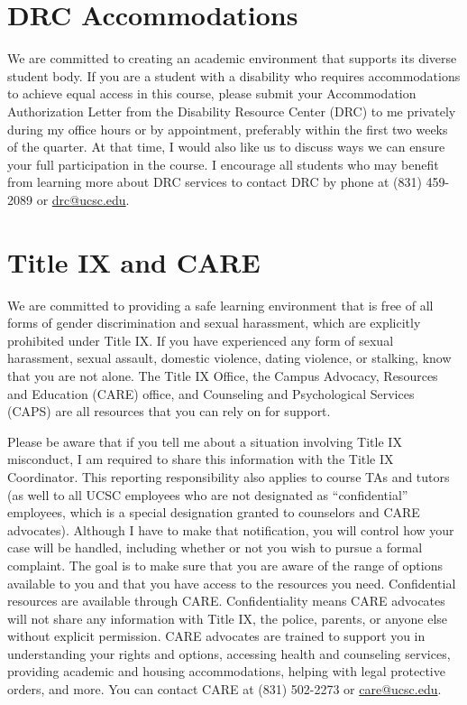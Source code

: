 \documentclass{article}
\begin{document}
\section{DRC Accommodations}
We are committed to creating an academic environment that
supports its diverse student body. If you are a student with a
disability who requires accommodations to achieve equal access in
this course, please submit your Accommodation Authorization Letter
from the Disability Resource Center (DRC) to me privately during
my office hours or by appointment, preferably within the first two
weeks of the quarter. At that time, I would also like us to discuss
ways we can ensure your full participation in the course. I encourage
all students who may benefit from learning more about DRC services
to contact DRC by phone at (831) 459-2089 or \url{drc@ucsc.edu}.

\section{Title IX and CARE}
We are committed to providing a safe learning environment
that is free of all forms of gender discrimination and sexual
harassment, which are explicitly prohibited under Title IX. If you
have experienced any form of sexual harassment, sexual assault,
domestic violence, dating violence, or stalking, know that you are
not alone. The Title IX Office, the Campus Advocacy, Resources and
Education (CARE) office, and Counseling and Psychological Services
(CAPS) are all resources that you can rely on for support.

Please be aware that if you tell me about a situation involving Title IX
misconduct, I am required to share this information with the Title IX
Coordinator. This reporting responsibility also applies to course TAs and tutors
(as well to all UCSC employees who are not designated as ``confidential''
employees, which is a special designation granted to counselors and CARE
advocates). Although I have to make that notification, you will control how your
case will be handled, including whether or not you wish to pursue a formal
complaint. The goal is to make sure that you are aware of the range of options
available to you and that you have access to the resources you need.
Confidential resources are available through CARE. Confidentiality means CARE
advocates will not share any information with Title IX, the police, parents, or
anyone else without explicit permission.  CARE advocates are trained to support
you in understanding your rights and options, accessing health and counseling
services, providing academic and housing accommodations, helping with legal
protective orders, and more. You can contact CARE at (831) 502-2273 or
\url{care@ucsc.edu}.
\end{document}
